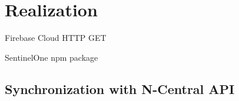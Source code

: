 \chapter{Realization}

Firebase Cloud HTTP GET

SentinelOne \acrshort{npm} package

\section{Synchronization with N-Central API}
